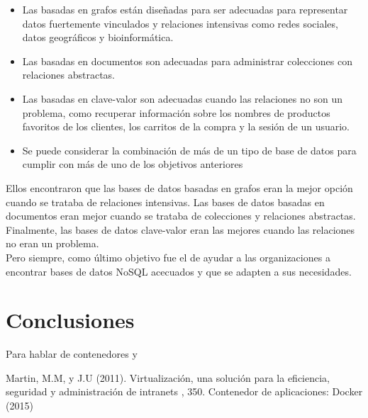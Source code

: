 \documentclass[twoside,twocolumn]{article}
\begin{document}
\begin{itemize}	
	\item Las basadas en grafos están diseñadas para ser adecuadas para representar datos fuertemente vinculados y relaciones intensivas como redes sociales, datos geográficos y bioinformática.
	\item Las basadas en documentos son adecuadas para administrar colecciones con relaciones abstractas.
	\item Las basadas en clave-valor son adecuadas cuando las relaciones no son un problema, como recuperar información sobre los nombres de productos favoritos de los clientes, los carritos de la compra y la sesión de un usuario.
	\item Se puede considerar la combinación de más de un tipo de base de datos para cumplir con más de uno de los objetivos anteriores
\end{itemize}

Ellos encontraron que las bases de datos basadas en grafos eran la mejor opción cuando se trataba de relaciones intensivas. Las bases de datos basadas en documentos eran mejor cuando se trataba de colecciones y relaciones abstractas. Finalmente, las bases de datos clave-valor eran las mejores cuando las relaciones no eran un problema. \\
Pero siempre, como último objetivo fue el de ayudar a las organizaciones a encontrar bases de datos NoSQL acecuados y que se adapten a sus necesidades. 

\section{Conclusiones}

Para hablar de contenedores y

\begin{thebibliography}{99} %

Martin, M.M,  y J.U (2011).
\newblock Virtualización, una solución para la eficiencia,
seguridad y administración de intranets
, 350.
\newblock Contenedor de aplicaciones: Docker (2015)
 
 
\end{thebibliography}

\end{document}
